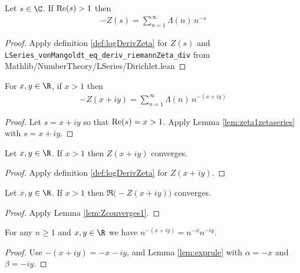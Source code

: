 \begin{lemma}\label{lem:zeta1zetaseries}  \leanok
Let $s\in\C$. If ${\rm Re}(s)>1$ then
\begin{align*}
-Z(s) = \sum_{n=1}^{\infty} \Lambda(n)\,n^{-s}
\end{align*}
\end{lemma}
\begin{proof} \leanok {}
Apply definition \ref{def:logDerivZeta} for $Z(s)$ and
{\tt LSeries\_vonMangoldt\_eq\_deriv\_riemannZeta\_div} from Mathlib/NumberTheory/LSeries/Dirichlet.lean
\end{proof}

\begin{lemma}\label{lem:zeta1zetaseriesxy}  \leanok
For $x,y\in\R$, if $x>1$ then
\begin{align*}
-Z(x+iy) = \sum_{n=1}^{\infty} \Lambda(n)\,n^{-(x+iy)}
\end{align*}
\end{lemma}
\begin{proof} \leanok {}
Let $s=x+iy$ so that ${\rm Re}(s)=x>1$.
Apply Lemma \ref{lem:zeta1zetaseries} with $s=x+iy$.
\end{proof}

\begin{lemma}[Converges]\label{lem:Zconverges1}  \leanok
Let $x,y\in\R$. If $x>1$ then $Z(x+iy)$ converges.
\end{lemma}
\begin{proof} \leanok {}
Apply definition \ref{def:logDerivZeta} for $Z(x+iy)$.
\end{proof}

\begin{lemma}\label{lem:ReZconverges1}  \leanok
Let $x,y\in\R$. If $x>1$ then $\Re\big(-Z(x+iy)\big)$ converges.
\end{lemma}
\begin{proof} \leanok {}
Apply Lemma \ref{lem:Zconverges1}.
\end{proof}

\begin{lemma}\label{lem:nxy}  \leanok
For any $n\ge1$ and $x,y\in\R$ we have $n^{-(x+iy)} = n^{-x} n^{-iy}$.
\end{lemma}
\begin{proof} \leanok {}
Use $-(x+iy) = -x-iy$, and Lemma \ref{lem:exprule} with $\alpha=-x$ and $\beta=-iy$.
\end{proof}

